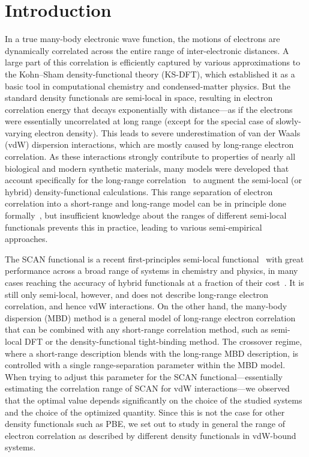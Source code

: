 \section{Introduction}

In a true many-body electronic wave function, the motions of electrons are dynamically correlated across the entire range of inter-electronic distances.
A large part of this correlation is efficiently captured by various approximations to the Kohn--Sham density-functional theory (KS-DFT), which established it as a basic tool in computational chemistry and condensed-matter physics.
But the standard density functionals are semi-local in space, resulting in electron correlation energy that decays exponentially with distance---as if the electrons were essentially uncorrelated at long range (except for the special case of slowly-varying electron density).
This leads to severe underestimation of van der Waals (vdW) dispersion interactions, which are mostly caused by long-range electron correlation.
As these interactions strongly contribute to properties of nearly all biological and modern synthetic materials, many models were developed that account specifically for the long-range correlation~\cite{DionPRL04,VydrovJCP10a,JohnsonJCP06,TkatchenkoPRL09,GrimmeJCP10,AmbrosettiJCP14} to augment the semi-local (or hybrid) density-functional calculations.
This range separation of electron correlation into a short-range and long-range model can be in principle done formally~\cite{HermannCR17}, but insufficient knowledge about the ranges of different semi-local functionals prevents this in practice, leading to various semi-empirical approaches.

The SCAN functional is a recent first-principles semi-local functional~\cite{SunPRL15} with great performance across a broad range of systems in chemistry and physics, in many cases reaching the accuracy of hybrid functionals at a fraction of their cost~\cite{SunNC16}.
It is still only semi-local, however, and does not describe long-range electron correlation, and hence vdW interactions.
On the other hand, the many-body dispersion (MBD) method is a general model of long-range electron correlation~\cite{TkatchenkoPRL12,AmbrosettiJCP14} that can be combined with any short-range correlation method, such as semi-local DFT or the density-functional tight-binding method.
The crossover regime, where a short-range description blends with the long-range MBD description, is controlled with a single range-separation parameter within the MBD model.
When trying to adjust this parameter for the SCAN functional---essentially estimating the correlation range of SCAN for vdW interactions---we observed that the optimal value depends significantly on the choice of the studied systems and the choice of the optimized quantity.
Since this is not the case for other density functionals such as PBE, we set out to study in general the range of electron correlation as described by different density functionals in vdW-bound systems.

